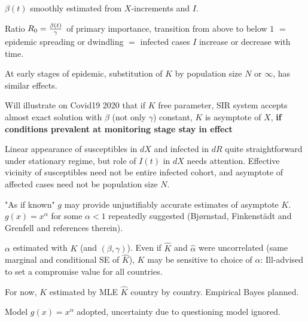 \documentclass{article}
\begin{document}
\newpage 

\noindent $\beta(t)$ smoothly estimated from $X$-increments and $I$.

\bigskip

\noindent Ratio $R_0={{\beta(t)} \over \gamma}$ of primary importance, transition from above to below $1$ $=$ epidemic spreading or dwindling $=$ infected cases $I$ increase or decrease with time.

\bigskip

\noindent At early stages of epidemic, substitution of $K$ by population size $N$ or $\infty$, has similar effects. 

\bigskip

\noindent Will illustrate on Covid19 2020 that if $K$ free parameter, SIR system accepts almost exact solution with $\beta$ (not only $\gamma$) constant, $K$ is asymptote of $X$, {\bf if conditions prevalent at monitoring stage stay in effect}

\newpage

\noindent Linear appearance of susceptibles in $dX$ and infected in $dR$ quite straightforward under stationary regime, but role of $I(t)$ in $dX$ needs attention. Effective vicinity of susceptibles need not be entire infected cohort, and asymptote of affected cases need not be population size $N$.

\bigskip

\noindent "As if known" $g$ may provide unjustifiably accurate estimates of asymptote $K$. $g(x)=x^\alpha$ for some \linebreak $\alpha<1$ repeatedly suggested (Bj{\o}rnstad, Finkenst\"{a}dt and Grenfell and references therein).

\newpage 

\noindent $\alpha$ estimated with $K$ (and $(\beta, \gamma)$). Even if $\hat{K}$ and $\hat{\alpha}$ were uncorrelated (same marginal and conditional SE of $\hat{K}$), $K$ may be sensitive to choice of $\alpha$:  Ill-advised to set a compromise value for all countries.

\bigskip

\noindent For now, $K$ estimated by MLE $\hat{K}$ country by country. Empirical Bayes planned.

\bigskip

\noindent Model $g(x)=x^\alpha$ adopted, uncertainty due to \linebreak questioning model ignored.

\end{document}
